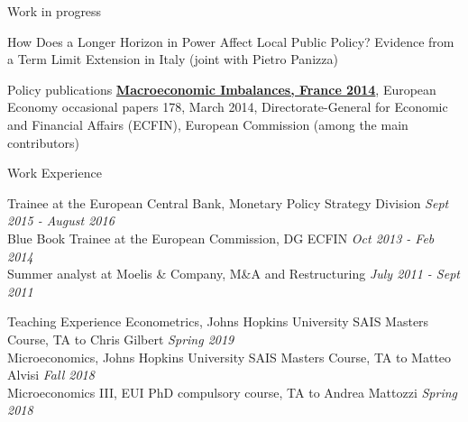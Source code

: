 \documentclass{resume} %
\begin{document}
\begin{rSection}{Work in progress}


How Does a Longer Horizon in Power Affect Local Public Policy? Evidence from a Term Limit Extension in Italy (joint with Pietro Panizza)



\end{rSection}


\begin{rSection}{Policy publications}
\href{https://ec.europa.eu/economy_finance/publications/occasional_paper/2014/pdf/ocp178_en.pdf}{\textbf{Macroeconomic Imbalances, France 2014}}, European Economy occasional papers 178, March 2014, Directorate-General for Economic and Financial Affairs  (ECFIN), European Commission (among the main contributors)



\end{rSection}





\newpage
\begin{rSection}{Work Experience}
	

	 {Trainee at the European Central Bank, Monetary Policy Strategy Division} \hfill {\em Sept 2015 - August 2016}
	\\ {Blue Book Trainee at the European Commission, DG ECFIN} \hfill {\em Oct 2013 - Feb 2014} 
	\\ {Summer analyst at Moelis \& Company, M\&A and Restructuring} \hfill {\em July 2011 - Sept 2011} 
	
	
\end{rSection}




\begin{rSection}{Teaching Experience}
{Econometrics, Johns Hopkins University SAIS Masters Course, TA to Chris Gilbert} \hfill {\em Spring 2019} 
\\ {Microeconomics, Johns Hopkins University SAIS Masters Course, TA to Matteo Alvisi} \hfill {\em Fall 2018} 
\\ {Microeconomics III, EUI PhD compulsory course, TA to Andrea Mattozzi} \hfill {\em Spring 2018} 
\end{rSection}
\end{document}
